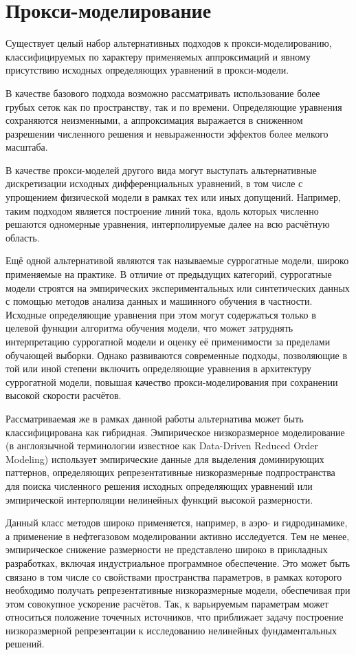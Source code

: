 \section{Прокси-моделирование}

Существует целый набор альтернативных подходов к прокси-моделированию, классифицируемых по характеру применяемых аппроксимаций и явному присутствию исходных определяющих уравнений в прокси-модели.

В качестве базового подхода возможно рассматривать использование более грубых сеток как по пространству, так и по времени. Определяющие уравнения сохраняются неизменными, а аппроксимация выражается в сниженном разрешении численного решения и невыраженности эффектов более мелкого масштаба.

В качестве прокси-моделей другого вида могут выступать альтернативные дискретизации исходных дифференциальных уравнений, в том числе с упрощением физической модели в рамках тех или иных допущений. Например, таким подходом является построение линий тока, вдоль которых численно решаются одномерные уравнения, интерполируемые далее на всю расчётную область.

Ещё одной альтернативой являются так называемые суррогатные модели, широко применяемые на практике.
В отличие от предыдущих категорий, суррогатные модели строятся на эмпирических экспериментальных или синтетических данных с помощью методов анализа данных и машинного обучения в частности.
Исходные определяющие уравнения при этом могут содержаться только в целевой функции алгоритма обучения модели, что может затруднять интерпретацию суррогатной модели и оценку её применимости за пределами обучающей выборки.
Однако развиваются современные подходы, позволяющие в той или иной степени включить определяющие уравнения в архитектуру суррогатной модели, повышая качество прокси-моделирования при сохранении высокой скорости расчётов.

Рассматриваемая же в рамках данной работы альтернатива может быть классифицирована как гибридная.
Эмпирическое низкоразмерное моделирование (в англоязычной терминологии известное как Data-Driven Reduced Order Modeling) использует эмпирические данные для выделения доминирующих паттернов, определяющих репрезентативные низкоразмерные подпространства для поиска численного решения исходных определяющих уравнений или эмпирической интерполяции нелинейных функций высокой размерности.

Данный класс методов широко применяется, например, в аэро- и гидродинамике, а применение в нефтегазовом моделировании активно исследуется.
Тем не менее, эмпирическое снижение размерности не представлено широко в прикладных разработках, включая индустриальное программное обеспечение.
Это может быть связано в том числе со свойствами пространства параметров, в рамках которого необходимо получать репрезентативные низкоразмерные модели, обеспечивая при этом совокупное ускорение расчётов.
Так, к варьируемым параметрам может относиться положение точечных источников, что приближает задачу построение низкоразмерной репрезентации к исследованию нелинейных фундаментальных решений.

